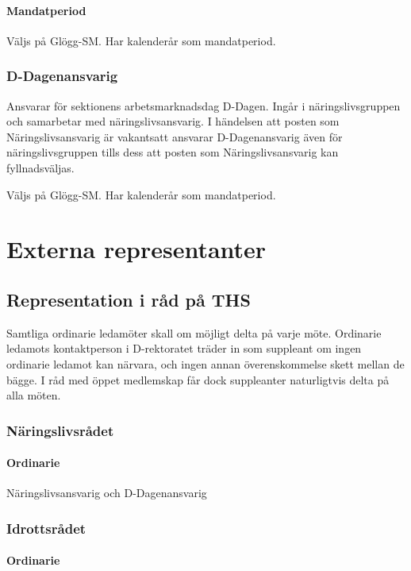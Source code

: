 \documentclass{dgovdoc}
\begin{document}
\paragraph{Mandatperiod}

Väljs på Glögg-SM. Har kalenderår som mandatperiod.

\subsubsection{D-Dagenansvarig}

Ansvarar för sektionens arbetsmarknadsdag D-Dagen. Ingår i näringslivsgruppen och samarbetar med näringslivsansvarig. I händelsen att posten som Näringslivsansvarig är vakantsatt ansvarar D-Dagenansvarig även för näringslivsgruppen tills dess att posten som Näringslivsansvarig kan fyllnadsväljas.


Väljs på Glögg-SM. Har kalenderår som mandatperiod.

\section{Externa representanter}

\subsection{Representation i råd på THS}

Samtliga ordinarie ledamöter skall om möjligt delta på varje möte. Ordinarie
ledamots kontaktperson i D-rektoratet träder in som suppleant om ingen
ordinarie ledamot kan närvara, och ingen annan överenskommelse skett mellan de
bägge. I råd med öppet medlemskap får dock suppleanter naturligtvis delta på
alla möten.

\subsubsection{Näringslivsrådet}

\paragraph{Ordinarie}

Näringslivsansvarig och D-Dagenansvarig

\subsubsection{Idrottsrådet}

\paragraph{Ordinarie}
\end{document}
